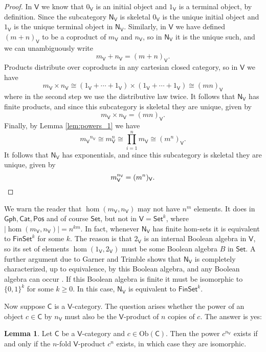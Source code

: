 \documentclass{amsart}
\theoremstyle{definition}
\newtheorem{lemma}[theorem]{Lemma}
\newcommand{\Gph}{\mathsf{Gph}}
\newcommand{\Set}{\mathsf{Set}}
\newcommand{\Cat}{\mathsf{Cat}}
\newcommand{\Pos}{\mathsf{Pos}}
\newcommand{\FinSet}{\mathsf{FinSet}}
\newcommand{\NN}{\mathsf{N}}
\newcommand{\V}{\mathsf{V}}
\newcommand{\C}{\mathsf{C}}
\newcommand{\Obj}{\mathrm{Ob}}
\begin{document}
\begin{proof}
 In $\V$ we know that $0_\V$ is an initial object and $1_\V$ is a terminal object, by
 definition.  Since the subcategory $\NN_\V$ is skeletal $0_\V$ is the unique 
 initial object and $1_\V$ is the unique terminal object in $\NN_\V$.   Similarly, in
 $\V$ we have defined $(m+n)_\V$ to be a coproduct of $m_\V$ and $n_\V$, so 
 in $\NN_\V$ it is the unique such, and we can unambiguously write 
 \[      m_\V + n_\V = (m + n)_\V .  \]
 Products distribute over coproducts in any cartesian closed category, so in $\V$ we have 
 \[   m_\V \times n_\V \cong (1_\V + \cdots + 1_\V) \times (1_\V + \cdots + 1_\V) 
 \cong (mn)_\V \]
 where in the second step we use the distributive law twice.
 It follows that $\NN_\V$ has finite products, and since this subcategory is skeletal
 they are unique, given by
 \[   m_\V \times n_\V = (mn)_\V.  \]
 Finally, by Lemma \ref{lem:powers_1} we have
 \[  {m_\V}^{n_\V} \cong m_\V^n \cong \prod_{i = 1}^n m_\V \cong
 (m^n)_\V .\]
 It follows that $\NN_\V$ has exponentials, and since this subcategory is skeletal they
 are unique, given by
 \[     m_\V^{n_\V} = (m^n)_\V .  \qedhere\]
\end{proof}

We warn the reader that $\hom(m_\V,n_\V)$ may not have $n^m$ elements.  It does
in $\Gph,\Cat,\Pos$ and of course $\Set$, but not in $\V = \Set^k$, where
$|\hom(m_\V, n_\V)| = n^{km}$.    In fact, whenever $\NN_\V$ has finite hom-sets
it is equivalent to $\FinSet^k$ for some $k$.   The reason is that $2_\V$ is 
an internal Boolean algebra in $\V$, so its set of elements $\hom(1_\V,2_\V)$ 
must be some Boolean algebra $B$ in $\Set$.   A further argument due to Garner and Trimble shows that $\NN_\V$ is completely characterized, up to equivalence, by this Boolean algebra, and any Boolean algebra can occur \cite{nCafe}.   If this Boolean algebra is finite it must be isomorphic to $\{0,1\}^k$ for some $k \ge 0$.  In this case, $\NN_\V$ is equivalent to $\FinSet^k$.

Now suppose $\C$ is a $\V$-category.   The question arises whether the
power of an object $c \in \C$ by $n_\V$ must also be the $\V$-product of $n$ copies
of $c$.   The answer is yes:

\begin{lemma}
\label{lem:powers_2}
Let $\C$ be a $\V$-category and $c \in \Obj(\C)$.  Then the power $c^{n_\V}$ exists
if and only if the $n$-fold $\V$-product $c^n$ exists, in which case they are isomorphic.
\end{lemma}
\end{document}
